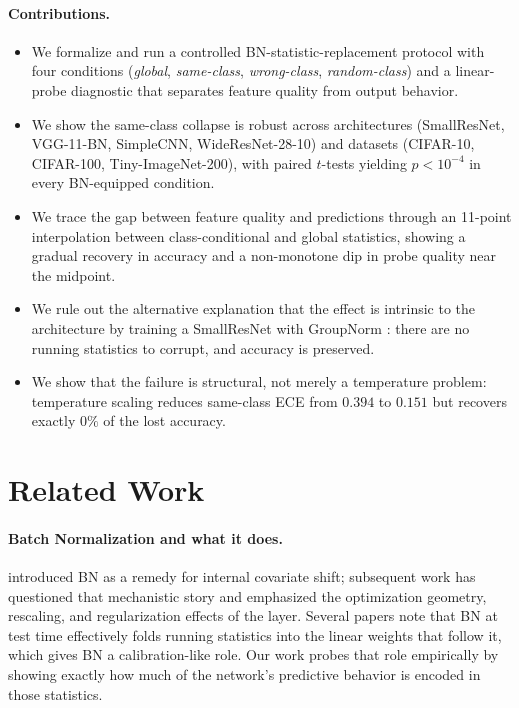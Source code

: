 \documentclass[11pt]{article}
\begin{document}
\paragraph{Contributions.}
\begin{itemize}
\item We formalize and run a controlled BN-statistic-replacement protocol with four conditions (\textit{global}, \textit{same-class}, \textit{wrong-class}, \textit{random-class}) and a linear-probe diagnostic that separates feature quality from output behavior.
\item We show the same-class collapse is robust across architectures (SmallResNet, VGG-11-BN, SimpleCNN, WideResNet-28-10) and datasets (CIFAR-10, CIFAR-100, Tiny-ImageNet-200), with paired $t$-tests yielding $p < 10^{-4}$ in every BN-equipped condition.
\item We trace the gap between feature quality and predictions through an 11-point interpolation between class-conditional and global statistics, showing a gradual recovery in accuracy and a non-monotone dip in probe quality near the midpoint.
\item We rule out the alternative explanation that the effect is intrinsic to the architecture by training a SmallResNet with GroupNorm \cite{wu2018}: there are no running statistics to corrupt, and accuracy is preserved.
\item We show that the failure is structural, not merely a temperature problem: temperature scaling \cite{guo2017} reduces same-class ECE from $0.394$ to $0.151$ but recovers exactly $0\%$ of the lost accuracy.
\end{itemize}

\section{Related Work}

\paragraph{Batch Normalization and what it does.}
\citet{ioffe2015} introduced BN as a remedy for internal covariate shift; subsequent work has questioned that mechanistic story \cite{santurkar2018} and emphasized the optimization geometry, rescaling, and regularization effects of the layer. Several papers note that BN at test time effectively folds running statistics into the linear weights that follow it, which gives BN a calibration-like role. Our work probes that role empirically by showing exactly how much of the network's predictive behavior is encoded in those statistics.
\end{document}
